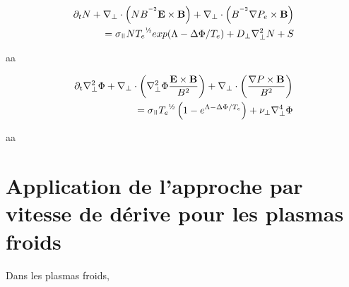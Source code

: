 \begin{refsection}
	\begin{equation}\begin{split}
		\partial_t N + \nabla_\perp\cdot\left(NB^{^{-2}}\mathbf{E}\times\mathbf{B}\right)
		+ \nabla_\perp\cdot\left(B^{^{-2}}\nabla P_e\times\mathbf{B}\right)
		  \\= \sigma_\para N{T_e}^{\text{\textonehalf}} exp({\Lambda-\Delta\Phi/T_e}) 
		 + D_\perp\nabla^2_\perp N + S
		 \end{split}
	\end{equation}
	
	aa
	
	\begin{equation}\begin{split}
			\partial_\text{t}\nabla_\perp^2 \Phi +\nabla_\perp\cdot\left(\nabla_\perp^2 \Phi\frac{\mathbf{E}\times\mathbf{B}}{B^2}\right)
			+ \nabla_\perp\cdot\left(\frac{\nabla P\times\mathbf{B}}{B^2}\right)
			\\= 
		\sigma_\para {T_e}^{\text{\textonehalf}}\left(1-e^{\Lambda-\Delta\Phi/T_e}\right) +\nu_\perp\nabla_\perp^4\Phi
	\end{split}\end{equation}
	
	aa
	
\section{Application de l'approche par vitesse de dérive pour les plasmas
froids}
\label{vitessesDerivePlasmaFroid}
Dans les plasmas froids,

%
%

\end{refsection}




